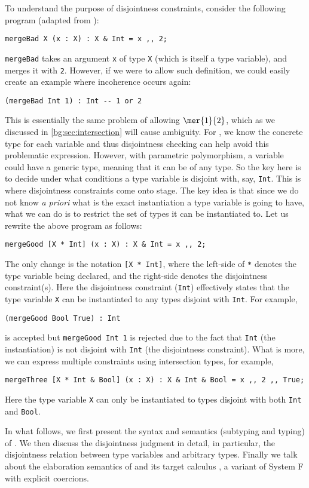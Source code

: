 To understand the purpose of disjointness constraints, consider the following program (adapted from \citet{alpuimdisjoint}):
\begin{lstlisting}
mergeBad X (x : X) : X & Int = x ,, 2;
\end{lstlisting}
\lstinline{mergeBad} takes an argument \lstinline{x} of type \lstinline{X} (which is itself a type variable), and merges it with \lstinline{2}.
However, if we were to allow such definition, we could easily create an example where incoherence occurs again:
\begin{lstlisting}
(mergeBad Int 1) : Int -- 1 or 2
\end{lstlisting}
This is essentially the same problem of allowing $\mer{1}{2}$, which as we
discussed in \cref{bg:sec:intersection} will cause ambiguity. For \namee, we
know the concrete type for each variable and thus disjointness checking can help
avoid this problematic expression. However, with parametric polymorphism, a variable
could have a generic type, meaning that it can be of any type. So the key here
is to decide under what conditions a type variable is disjoint with, say,
\lstinline{Int}. This is where disjointness constraints come onto stage. The key idea
is that since we do not know \textit{a priori} what is the exact instantiation a
type variable is going to have, what we can do is to restrict the set of types
it can be instantiated to. Let us rewrite the above program as follows:
\begin{lstlisting}
mergeGood [X * Int] (x : X) : X & Int = x ,, 2;
\end{lstlisting}
The only change is the notation \lstinline{[X * Int]}, where the left-side of
\lstinline{*} denotes the type variable being declared, and the right-side
denotes the disjointness constraint(s). Here the disjointness constraint
(\lstinline{Int}) effectively states that the type variable \lstinline{X} can be
instantiated to any types disjoint with \lstinline{Int}. For example,
\begin{lstlisting}
(mergeGood Bool True) : Int
\end{lstlisting}
is accepted but \lstinline{mergeGood Int 1} is rejected due to the fact that \lstinline{Int} (the instantiation) is not disjoint with
\lstinline{Int} (the disjointness constraint). What is more, we can express multiple
constraints using intersection types, for example,
\begin{lstlisting}
mergeThree [X * Int & Bool] (x : X) : X & Int & Bool = x ,, 2 ,, True;
\end{lstlisting}
Here the type variable \lstinline{X} can only be instantiated to types disjoint with both
\lstinline{Int} and \lstinline{Bool}.

In what follows, we first present the syntax and semantics (subtyping and typing) of \fnamee. We
then discuss the disjointness judgment in detail, in particular, the
disjointness relation between type variables and arbitrary types. Finally we
talk about the elaboration semantics of \fnamee and its target calculus \tnamee,
a variant of System F with explicit coercions.



